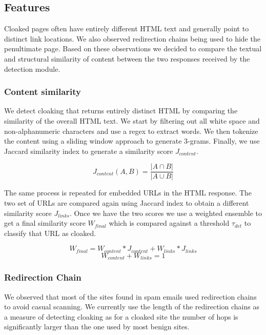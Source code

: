 \documentclass[letterpaper,twocolumn,10pt]{article}
\begin{document}
\subsection{Features}
Cloaked pages often have entirely different HTML text and generally point to distinct link locations. We also observed redirection chains being used to hide the penultimate page. Based on these observations we decided to compare the textual and structural similarity of content between the two responses received by the detection module.

\subsubsection{Content similarity}
We detect cloaking that returns entirely distinct HTML by comparing the similarity of the overall HTML text. We start by filtering out all white space and non-alphanumeric characters and use a regex to extract words. We then tokenize the content using a sliding window approach to generate 3-grams. Finally, we use Jaccard similarity index to generate a similarity score $J_{content}$.

\begin{equation}
J_{content}(A, B) = \frac{|A \cap B|}{|A \cup B|}
\end{equation}

The same process is repeated for embedded URLs in the HTML response. The two set of URLs are compared again using Jaccard index to obtain a different similarity score $J_{links}$. Once we have the two scores we use a weighted ensemble to get a final similarity score $W_{final}$ which is compared against a threshold $\tau_{det}$ to classify that URL as cloaked.


\begin{equation}
W_{final} =  W_{content} * J_{content} + W_{links} * J_{links}
\end{equation}
\begin{equation}
W_{content} + W_{links}  =   1
\end{equation}

\subsubsection{Redirection Chain}
We observed that most of the sites found in spam emails used redirection chains to avoid casual scanning. We currently use the length of the redirection chains as a measure of detecting cloaking as for a cloaked site the number of hops is significantly larger than the one used by most benign sites.
\end{document}
